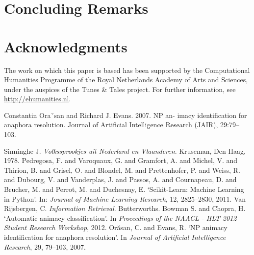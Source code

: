 \documentclass[a4paper,UKenglish]{oasics}
\begin{document}
\section{Concluding Remarks}

\section*{Acknowledgments}

The work on which this paper is based has been supported by the
Computational Humanities Programme of the Royal Netherlands Academy of
Arts and Sciences, under the auspices of the Tunes \& Tales
project. For further information, see \url{http://ehumanities.nl}.

Constantin Oraˇsan and Richard J. Evans. 2007. NP an- imacy identification for anaphora resolution. Journal of Artificial Intelligence Research (JAIR), 29:79–103.
\begin{thebibliography}{50}
 Sinninghe J. \textit{Volkssprookjes uit
    Nederland en Vlaanderen}. Kruseman, Den Haag, 1978.
 Pedregosa, F. and Varoquaux, G. and Gramfort, A. and Michel, V.
         and Thirion, B. and Grisel, O. and Blondel, M. and Prettenhofer, P.
         and Weiss, R. and Dubourg, V. and Vanderplas, J. and Passos, A. and
         Cournapeau, D. and Brucher, M. and Perrot, M. and Duchesnay,
         E. `Scikit-Learn: Machine Learning in {P}ython'. In:
         \textit{Journal of Machine Learning Research}, 12,
         2825--2830, 2011.
 {Van Rijsbergen}, C. \textit{Information
    Retrieval}. Butterworths.
 Bowman S. and Chopra, H. `Automatic animacy
  classification'. In \textit{Proceedings of the NAACL - HLT 2012
    Student Research Workshop}, 2012.
 Or\u{a}san, C. and Evans, R. `NP animacy
  identification for anaphora resolution'. In \textit{Journal of
    Artificial Intelligence Research}, 29, 79--103, 2007.
\end{thebibliography}
\end{document}

